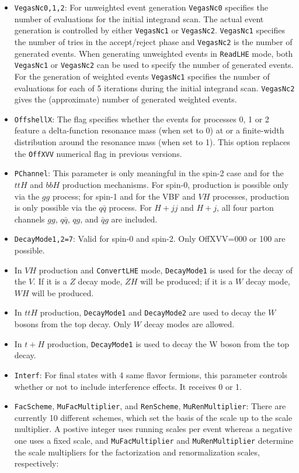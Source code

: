 \documentclass[aps,superscriptaddress,nofootinbib]{revtex4}
\begin{document}
\begin{itemize}
\item {\verb|VegasNc0,1,2|}: For unweighted event generation \verb|VegasNc0| specifies the number of evaluations for the initial integrand scan.  The actual event generation is controlled by either \verb|VegasNc1| or \verb|VegasNc2|. \verb|VegasNc1| specifies the number of tries in the accept/reject phase and \verb|VegasNc2| is the number of generated events. When generating unweighted events in \verb|ReadLHE| mode, both \verb|VegasNc1| or \verb|VegasNc2| can be used to specify the number of generated events. For the generation of weighted events \verb|VegasNc1| specifies the number of evaluations for each of 5 iterations during the initial integrand scan. \verb|VegasNc2| gives the (approximate) number of generated weighted events.
\item {\verb|OffshellX|}: The flag specifies whether the events for processes 0, 1 or 2 feature a delta-function resonance mass (when set to 0) at or a finite-width distribution around the resonance mass (when set to 1). This option replaces the \verb|OffXVV| numerical flag in previous versions.
\item \verb|PChannel|: This parameter is only meaningful in the spin-2 case and for the $ttH$ and $bbH$ production mechanisms.  For spin-0, production is possible only via the $gg$ process; for spin-1 and for the VBF and $VH$ processes, production is only possible via the $q\bar{q}$ process.  For $H+jj$ and $H+j$, all four parton channels $gg$, $q\bar{q}$, $qg$, and $\bar{q}g$ are included.
\item \verb|DecayMode1,2=7|: Valid for spin-0 and spin-2.  Only OffXVV=000 or 100 are possible.
\item In $VH$ production and \verb|ConvertLHE| mode, \verb|DecayMode1| is used for the decay of the $V$.  If it is a $Z$ decay mode, $ZH$ will be produced; if it is a $W$ decay mode, $WH$ will be produced.
\item In $ttH$ production, \verb|DecayMode1| and \verb|DecayMode2| are used to decay the $W$ bosons from the top decay.  Only $W$ decay modes are allowed.
\item In $t+H$ production, \verb|DecayMode1| is used to decay the W boson from the top decay.
\item \verb|Interf|: For final states with 4 same flavor fermions, this parameter controls whether or not to include interference effects. It receives 0 or 1.
\item \verb|FacScheme|, \verb|MuFacMultiplier|, and \verb|RenScheme|, \verb|MuRenMultiplier|: There are currently 10 different schemes, which set the basis of the scale up to the scale multiplier. A postive integer uses running scales per event whereas a negative one uses a fixed scale, and \verb|MuFacMultiplier| and \verb|MuRenMultiplier| determine the scale multipliers for the factorization and renormalization scales, respectively:

\end{itemize}
\end{document}

